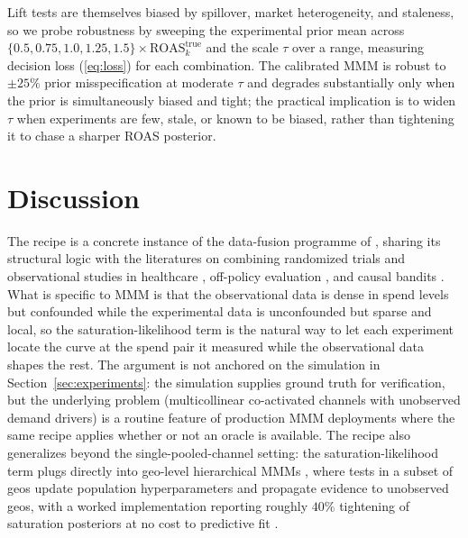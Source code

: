 \documentclass{uai2026} %
\newcommand{\ROAS}{\mathrm{ROAS}}
\begin{document}
Lift tests are themselves biased by spillover, market heterogeneity, and staleness, so we probe robustness by sweeping the experimental prior mean across $\{0.5, 0.75, 1.0, 1.25, 1.5\}\times \ROAS_k^\text{true}$ and the scale $\tau$ over a range, measuring decision loss (\ref{eq:loss}) for each combination.
The calibrated MMM is robust to $\pm 25\%$ prior misspecification at moderate $\tau$ and degrades substantially only when the prior is simultaneously biased and tight; the practical implication is to widen $\tau$ when experiments are few, stale, or known to be biased, rather than tightening it to chase a sharper ROAS posterior.

\section{Discussion}\label{sec:discussion}

The recipe is a concrete instance of the data-fusion programme of \citet{bareinboim2016causal}, sharing its structural logic with the literatures on combining randomized trials and observational studies in healthcare \citep{colnet2024causal,kallus2018removing,yang2020combining}, off-policy evaluation \citep{dudik2014ope}, and causal bandits \citep{lattimore2016causalbandits}.
What is specific to MMM is that the observational data is dense in spend levels but confounded while the experimental data is unconfounded but sparse and local, so the saturation-likelihood term is the natural way to let each experiment locate the curve at the spend pair it measured while the observational data shapes the rest.
The argument is not anchored on the simulation in Section~\ref{sec:experiments}: the simulation supplies ground truth for verification, but the underlying problem (multicollinear co-activated channels with unobserved demand drivers) is a routine feature of production MMM deployments where the same recipe applies whether or not an oracle is available.
The recipe also generalizes beyond the single-pooled-channel setting: the saturation-likelihood term plugs directly into geo-level hierarchical MMMs \citep{sun2017geolevel}, where tests in a subset of geos update population hyperparameters and propagate evidence to unobserved geos, with a worked implementation reporting roughly $40\%$ tightening of saturation posteriors at no cost to predictive fit \citep{pymcmarketing_geolift_calibration}.
\end{document}
